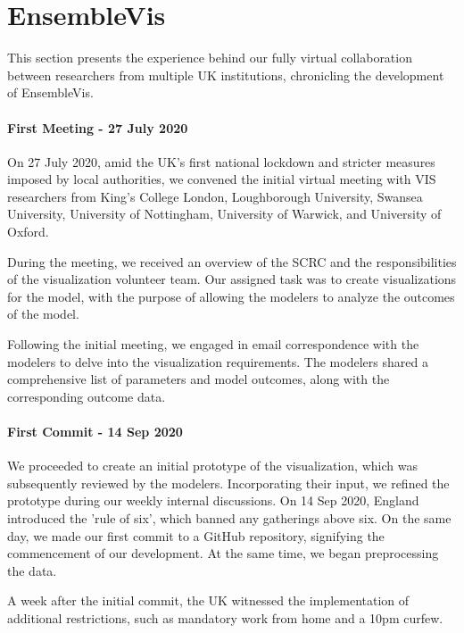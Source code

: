 \section{EnsembleVis}
\label{sec:EnsembleVis}

This section presents the experience behind our fully virtual collaboration between researchers from multiple UK institutions, chronicling the development of EnsembleVis.


\paragraph{First Meeting - 27 July 2020}
\label{subsec:InitialMeeting}
On 27 July 2020, amid the UK's first national lockdown and stricter measures imposed by local authorities, we convened the initial virtual meeting with VIS researchers from King's College London, Loughborough University, Swansea University, University of Nottingham, University of Warwick, and University of Oxford.

During the meeting, we received an overview of the SCRC and the responsibilities of the visualization volunteer team.
Our assigned task was to create visualizations for the model, with the purpose of allowing the modelers to analyze the outcomes of the model.

Following the initial meeting, we engaged in email correspondence with the modelers to delve into the visualization requirements. The modelers shared a comprehensive list of parameters and model outcomes, along with the corresponding outcome data.
\paragraph{First Commit - 14 Sep 2020}
We proceeded to create an initial prototype of the visualization, which was subsequently reviewed by the modelers.
Incorporating their input, we refined the prototype during our weekly internal discussions.
On 14 Sep 2020, England introduced the 'rule of six', which banned any gatherings above six.
On the same day, we made our first commit to a GitHub repository, signifying the commencement of our development.
At the same time, we began preprocessing the data.

A week after the initial commit, the UK witnessed the implementation of additional restrictions, such as mandatory work from home and a 10pm curfew.

